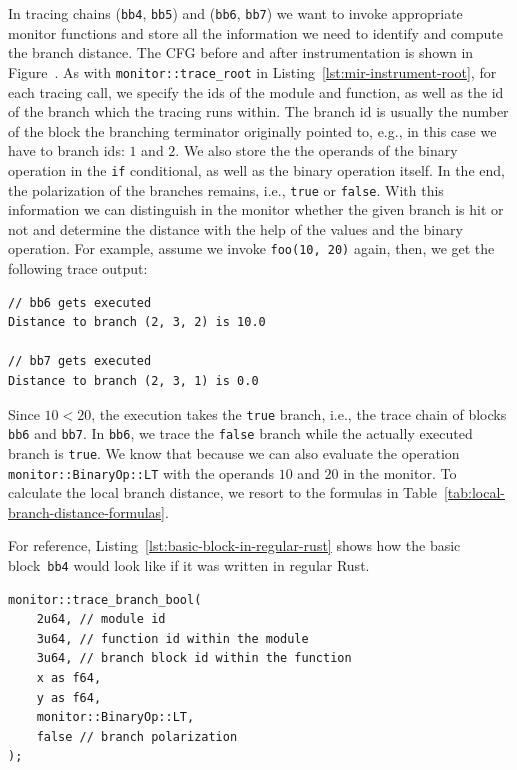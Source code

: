 \documentclass{article}
\begin{document}
In tracing chains (\lstinline{bb4}, \lstinline{bb5}) and (\lstinline{bb6}, \lstinline{bb7}) we want to invoke appropriate monitor functions and store all the information we need to identify and compute the branch distance. The \ac{CFG} before and after instrumentation is shown in Figure~. As with \lstinline{monitor::trace_root} in Listing~\ref{lst:mir-instrument-root}, for each tracing call, we specify the ids of the module and function, as well as the id of the branch which the tracing runs within. The branch id is usually the number of the block the branching terminator originally pointed to, e.g., in this case we have to branch ids: $1$ and $2$. We also store the the operands of the binary operation in the \lstinline{if} conditional, as well as the binary operation itself. In the end, the polarization of the branches remains, i.e., \lstinline{true} or \lstinline{false}. With this information we can distinguish in the monitor whether the given branch is hit or not and determine the distance with the help of the values and the binary operation. For example, assume we invoke \lstinline{foo(10, 20)} again, then, we get the following trace output:

\begin{lstlisting}[language={}, style=boxed, caption={}, label=lst:mir-instrument-branch-trace-output]
// bb6 gets executed
Distance to branch (2, 3, 2) is 10.0

// bb7 gets executed
Distance to branch (2, 3, 1) is 0.0
\end{lstlisting}

Since $10 < 20$, the execution takes the \lstinline{true} branch, i.e., the trace chain of blocks \lstinline{bb6} and \lstinline{bb7}. In \lstinline{bb6}, we trace the \lstinline{false} branch while the actually executed branch is \lstinline{true}. We know that because we can also evaluate the operation \lstinline{monitor::BinaryOp::LT} with the operands $10$ and $20$ in the monitor. To calculate the local branch distance, we resort to the formulas in Table~\ref{tab:local-branch-distance-formulas}.

For reference, Listing~\ref{lst:basic-block-in-regular-rust} shows how the basic block~\lstinline{bb4} would look like if it was written in regular Rust.

\begin{lstlisting}[language={}, style=boxed, caption={How would \lstinline{bb4} look like in regular Rust code}, label=lst:basic-block-in-regular-rust]
monitor::trace_branch_bool(
    2u64, // module id
    3u64, // function id within the module
    3u64, // branch block id within the function
    x as f64,
    y as f64,
    monitor::BinaryOp::LT,
    false // branch polarization
);
\end{lstlisting}
\end{document}

